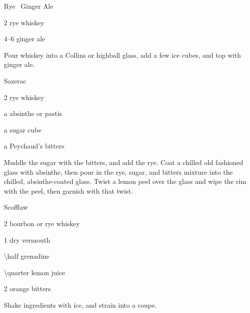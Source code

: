 \begin{Cocktail}{Rye \And\ Ginger Ale}
	\begin{Ingredients}
	\item \SI{2}{\oz} rye whiskey
	\item \SIrange{4}{6}{\oz} ginger ale
	\end{Ingredients}
	
	\begin{Instructions}
	Pour whiskey into a Collins or highball glass, add a few ice cubes, and top with ginger ale.
	\end{Instructions}
\end{Cocktail}

\begin{Cocktail}{Sazerac}
	\begin{Ingredients}
	\item \SI{2}{\oz} rye whiskey
	\item a \si{\splash} absinthe or pastis
	\item a sugar cube
	\item a \si{\dash} Peychaud's bitters
	\end{Ingredients}
	
	\begin{Instructions}
	Muddle the sugar with the bitters, and add the rye.  Coat a chilled old fashioned glass with absinthe, then pour in the rye, sugar, and bitters mixture into the chilled, absinthe-coated glass.  Twist a lemon peel over the glass and wipe the rim with the peel, then garnish with that twist.
	\end{Instructions}
\end{Cocktail}

\begin{Cocktail}{Scofflaw}
	\begin{Ingredients}
	\item \SI{2}{\oz} bourbon or rye whiskey
	\item \SI{1}{\oz} dry vermouth
	\item \SI{\half}{\oz} grenadine
	\item \SI{\quarter}{\oz} lemon juice
	\item 2 \si{\dashes} orange bitters
	\end{Ingredients}
	
	\begin{Instructions}
	Shake ingredients with ice, and strain into a coupe.
	\end{Instructions}
\end{Cocktail}

